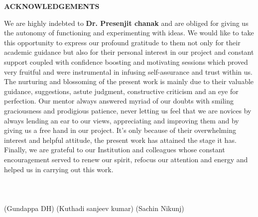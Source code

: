 
\newpage
\begin{center}
{\large \bf ACKNOWLEDGEMENTS}
\end{center}
We are highly indebted to {\bf Dr. Presenjit chanak}  and are obliged for giving us the autonomy of functioning and experimenting with ideas. We would like to take this opportunity to express our profound gratitude to them
not only for their academic guidance but also for their personal interest in our project and constant support coupled with
confidence boosting and motivating sessions which proved very fruitful and were instrumental in infusing self-assurance
and trust within us. The nurturing and blossoming of the present work is mainly due to their valuable guidance,
suggestions, astute judgment, constructive criticism and an eye for perfection. Our mentor always answered myriad of our
doubts with smiling graciousness and prodigious patience, never letting us feel that we are novices by always lending an
ear to our views, appreciating and improving them and by giving us a free hand in our project. It's only
because of their overwhelming interest and helpful attitude, the present work has attained the stage it has. \\
Finally, we are grateful to our Institution and colleagues whose constant encouragement served to renew our spirit,
refocus our attention and energy and helped us in carrying out this work.\\ \\ \\ \\
(Gundappa DH) \hspace{1in} (Kuthadi sanjeev kumar) \hspace{1in} (Sachin Nikunj)
